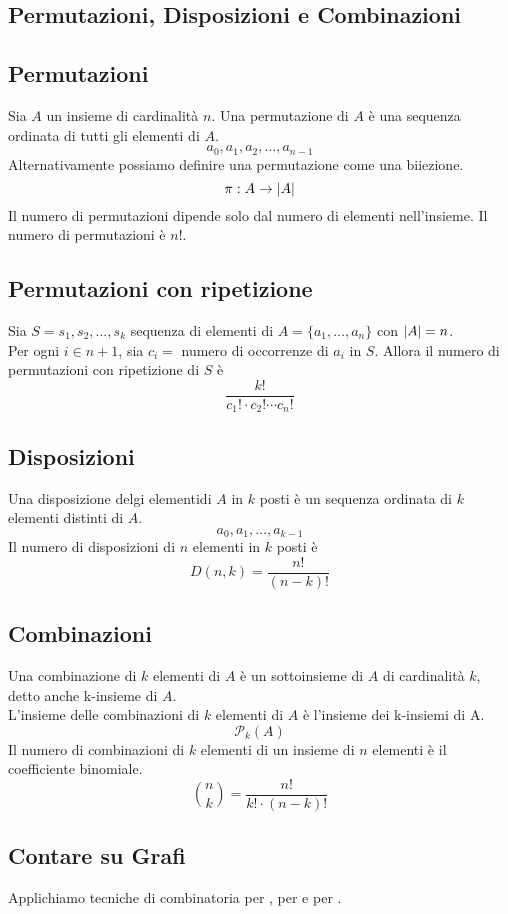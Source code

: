\documentclass{article}
\begin{document}
\subsection{Permutazioni, Disposizioni e Combinazioni}
\subsection*{Permutazioni}
Sia \(A\) un insieme di cardinalità \(n\). Una permutazione di \(A\) è una sequenza ordinata di tutti gli elementi di \(A\).
\[a_0, a_1, a_2, \ldots, a_{n-1}\]
Alternativamente possiamo definire una permutazione come una biiezione.
\[\pi: A \rightarrow \left\lvert A \right\rvert\]
Il numero di permutazioni dipende solo dal numero di elementi nell'insieme.
Il numero di permutazioni è \(n!\).
\subsection*{Permutazioni con ripetizione}
Sia \(S = s_1, s_2, \ldots, s_k\) sequenza di elementi di \(A = \{a_1,\ldots,a_n\}\) con \(\left\lvert A \right\rvert = n\). \\
Per ogni \(i \in n + 1\), sia \(c_i = \) numero di occorrenze di \(a_i\) in \(S\). Allora il numero di permutazioni con ripetizione di \(S\) è
\[\frac{k!}{c_1! \cdot c_2! \cdots c_n!}\]
\subsection*{Disposizioni}
Una disposizione delgi elementidi \(A\) in \(k\) posti è un sequenza ordinata di \(k\) elementi distinti di \(A\).
\[a_0,a_1,\ldots,a_{k-1}\]
Il numero di disposizioni di \(n\) elementi in \(k\) posti è
\[D(n,k) = \frac{n!}{(n-k)!}\]
\subsection*{Combinazioni}
Una combinazione di \(k\) elementi di \(A\) è un sottoinsieme di \(A\) di cardinalità \(k\), detto anche k-insieme di \(A\). \\
L'insieme delle combinazioni di \(k\) elementi di \(A\) è l'insieme dei k-insiemi di A.
\[\mathcal{P}_k(A)\]
Il numero di combinazioni di \(k\) elementi di un insieme di \(n\) elementi è il coefficiente binomiale.
\[\binom{n}{k} = \frac{n!}{k! \cdot (n - k)!}\]

\subsection{Contare su Grafi}
Applichiamo tecniche di combinatoria per , per  e per .
\end{document}
